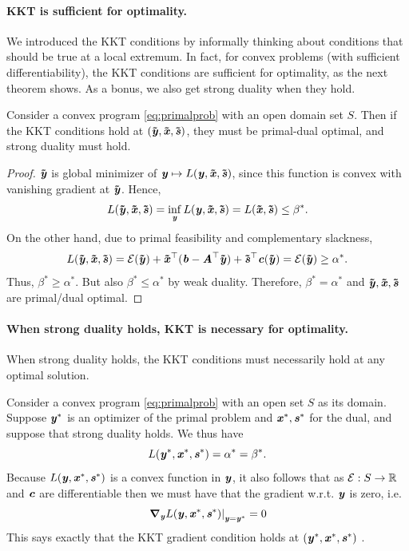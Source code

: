 \paragraph{KKT is sufficient for optimality.}
We introduced the KKT conditions by informally thinking about
conditions that should be true at a local extremum.
In fact, for convex problems (with sufficient differentiability), the
KKT conditions are sufficient for optimality, as the
next theorem shows.
As a bonus, we also get strong duality when they hold.
\begin{theorem}
  \label{thm:KKTsufficient}
   Consider a convex program \eqref{eq:primalprob} with an open domain
  set $S$.
   Then if the KKT conditions hold at $(\yytil,\xxtil,\sstil)$, they must be
   primal-dual optimal, and strong duality must hold.
\end{theorem}
\begin{proof}
  $\yytil$ is global minimizer of $\yy \mapsto L(\yy, \xxtil, \sstil)$, since this function is convex with vanishing gradient at $\yytil$. Hence,
  \[ L(\yytil, \xxtil, \sstil) = \inf_{\yy} L(\yy, \xxtil, \sstil) = L(\xxtil,\sstil) \leq \beta^*. \]
  On the other hand, due to primal feasibility and complementary slackness,
  \[ L(\yytil,\xxtil,\sstil) = \calE(\yytil) + \xxtil^\trp(\bb-\AA^\trp\yytil) + \sstil^\trp\cc(\yytil) = \calE(\yytil) \geq \alpha^*. \]
  Thus, $\beta^*\geq\alpha^*$. But also $\beta^*\leq\alpha^*$ by weak duality. Therefore, $\beta^*=\alpha^*$ and $\yytil,\xxtil,\sstil$ are primal/dual optimal.
\end{proof}

\paragraph{When strong duality holds, KKT is necessary for
  optimality.}
When strong duality holds, the KKT conditions must necessarily hold at
any optimal solution.

 Consider a convex program \eqref{eq:primalprob} with an open set $S$
 as its domain.
Suppose $\yy^*$ is an optimizer of the primal problem and $\xx^*,
\ss^*$ for the dual, and suppose that strong duality holds.
We thus have
\[ L(\yy^*, \xx^*, \ss^*) = \alpha^* = \beta^*. \]
Because $L(\yy, \xx^*, \ss^*)$ is a convex function in $\yy$, it also
follows that as $\energy: S \to \R$ and $\cc$ are differentiable then we must have that the
gradient w.r.t. $\yy$ is zero, i.e.
\begin{equation}
  \left.\grad_{\yy}L(\yy, \xx^*,
    \ss^*)\right|_{\yy=\yy^*} = 0
  \label{eq:KKTgradAtOpt}
\end{equation}
This says exactly that the KKT gradient condition holds at $(\yy^*, \xx^*, \ss^*)$ .

